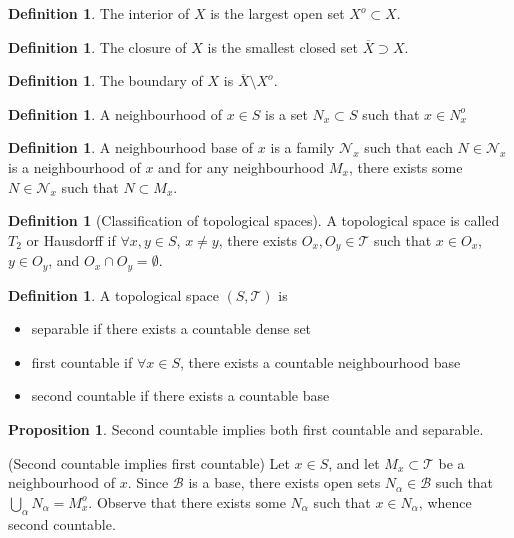 \documentclass[11pt]{article}
\theoremstyle{definition}
\newtheorem{defn}[thm]{Definition}
\newtheorem{prop}[thm]{Proposition}
\newcommand{\sm}[0]{\setminus}
\newcommand{\m}[1]{\mathcal{#1}}
\begin{document}
\begin{defn}
The interior of $X$ is the largest open set $X^o\subset X$.
\end{defn}

\begin{defn}
The closure of $X$ is the smallest closed set $\overline{X}\supset X$.
\end{defn}

\begin{defn}
The boundary of $X$ is $\overline{X}\sm X^o$.
\end{defn}

\begin{defn}
A neighbourhood of $x\in S$ is a set $N_x\subset S$ such that $x\in N^o_x$
\end{defn}

\begin{defn}
A neighbourhood base of $x$ is a family $\m{N}_x$ such that each $N\in \m{N}_x$ is a
neighbourhood of $x$ and for any neighbourhood $M_x$, there exists some $N\in \m{N}_x$ such
that $N\subset M_x$.
\end{defn}

\begin{defn}[Classification of topological spaces]
A topological space is called $T_2$ or Hausdorff if $\forall x,y\in S$, $x\neq y$, there
exists $O_x,O_y\in\m{T}$ such that $x\in O_x$, $y\in O_y$, and $O_x\cap O_y = \emptyset$.
\end{defn}

\begin{defn}
A topological space $(S,\m{T})$ is
\begin{itemize}
\item separable if there exists a countable dense set
\item first countable if $\forall x\in S$, there exists a countable neighbourhood base
\item second countable if there exists a countable base
\end{itemize}
\end{defn}

\begin{prop}
Second countable implies both first countable and separable.
\end{prop}
\proof
(Second countable implies first countable)
Let $x\in S$, and let $M_x\subset\m{T}$ be a neighbourhood of $x$. Since $\m{B}$ is a base,
there exists open sets $N_\alpha\in\m{B}$ such that $\bigcup_\alpha N_\alpha = M_x^o$.
Observe that there exists some $N_\alpha$ such that $x\in N_\alpha$, whence second
countable.
\end{document}
